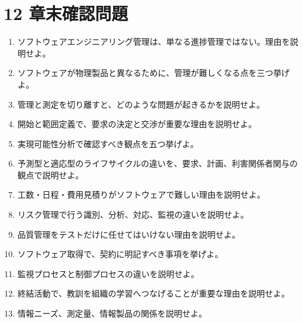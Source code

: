 \documentclass[a4paper,11pt]{ltjsarticle}
\begin{document}
\section{12 章末確認問題}
\begin{enumerate}[leftmargin=2em]
  \item ソフトウェアエンジニアリング管理は、単なる進捗管理ではない。理由を説明せよ。
  \item ソフトウェアが物理製品と異なるために、管理が難しくなる点を三つ挙げよ。
  \item 管理と測定を切り離すと、どのような問題が起きるかを説明せよ。
  \item 開始と範囲定義で、要求の決定と交渉が重要な理由を説明せよ。
  \item 実現可能性分析で確認すべき観点を五つ挙げよ。
  \item 予測型と適応型のライフサイクルの違いを、要求、計画、利害関係者関与の観点で説明せよ。
  \item 工数・日程・費用見積りがソフトウェアで難しい理由を説明せよ。
  \item リスク管理で行う識別、分析、対応、監視の違いを説明せよ。
  \item 品質管理をテストだけに任せてはいけない理由を説明せよ。
  \item ソフトウェア取得で、契約に明記すべき事項を挙げよ。
  \item 監視プロセスと制御プロセスの違いを説明せよ。
  \item 終結活動で、教訓を組織の学習へつなげることが重要な理由を説明せよ。
  \item 情報ニーズ、測定量、情報製品の関係を説明せよ。
\end{enumerate}
\begin{center}
\end{center}
\end{document}
